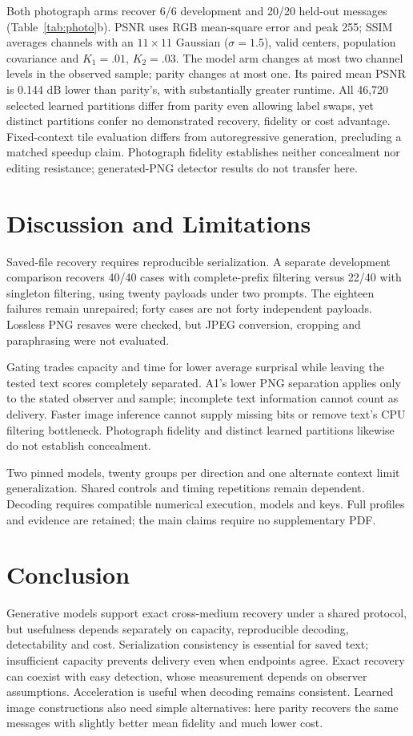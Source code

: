 \documentclass[orivec]{llncs}
\begin{document}
Both photograph arms recover 6/6 development and 20/20 held-out messages (Table~\ref{tab:photo}b). PSNR uses RGB mean-square error and peak 255; SSIM averages channels with an $11\times11$ Gaussian ($\sigma=1.5$), valid centers, population covariance and $K_1=.01$, $K_2=.03$. The model arm changes at most two channel levels in the observed sample; parity changes at most one. Its paired mean PSNR is 0.144 dB lower than parity's, with substantially greater runtime. All 46,720 selected learned partitions differ from parity even allowing label swaps, yet distinct partitions confer no demonstrated recovery, fidelity or cost advantage. Fixed-context tile evaluation differs from autoregressive generation, precluding a matched speedup claim. Photograph fidelity establishes neither concealment nor editing resistance; generated-PNG detector results do not transfer here.

\section{Discussion and Limitations}
Saved-file recovery requires reproducible serialization. A separate development comparison recovers 40/40 cases with complete-prefix filtering versus 22/40 with singleton filtering, using twenty payloads under two prompts. The eighteen failures remain unrepaired; forty cases are not forty independent payloads. Lossless PNG resaves were checked, but JPEG conversion, cropping and paraphrasing were not evaluated.

Gating trades capacity and time for lower average surprisal while leaving the tested text scores completely separated. A1's lower PNG separation applies only to the stated observer and sample; incomplete text information cannot count as delivery. Faster image inference cannot supply missing bits or remove text's CPU filtering bottleneck. Photograph fidelity and distinct learned partitions likewise do not establish concealment.

Two pinned models, twenty groups per direction and one alternate context limit generalization. Shared controls and timing repetitions remain dependent. Decoding requires compatible numerical execution, models and keys. Full profiles and evidence are retained; the main claims require no supplementary PDF.

\section{Conclusion}
Generative models support exact cross-medium recovery under a shared protocol, but usefulness depends separately on capacity, reproducible decoding, detectability and cost. Serialization consistency is essential for saved text; insufficient capacity prevents delivery even when endpoints agree. Exact recovery can coexist with easy detection, whose measurement depends on observer assumptions. Acceleration is useful when decoding remains consistent. Learned image constructions also need simple alternatives: here parity recovers the same messages with slightly better mean fidelity and much lower cost.
\end{document}
